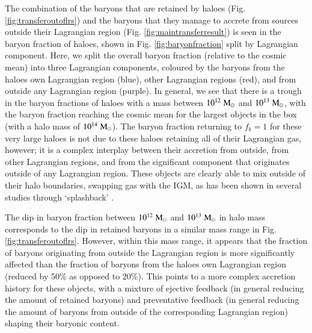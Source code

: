 \documentclass[fleqn,usenatbib]{mnras}
\newcommand{\msolar}{\;{\rm M}_{\odot}}
\begin{document}
The combination of the baryons that are retained by haloes (Fig.
\ref{fig:transferoutoflrs}) and the baryons that they manage to accrete from
sources outside their Lagrangian region (Fig. \ref{fig:maintransferresult})
is seen in the baryon fraction of haloes, shown in Fig.
\ref{fig:baryonfraction} split by Lagrangian component. Here, we split the
overall baryon fraction (relative to the cosmic mean) into three Lagrangian
components, coloured by the baryons from the haloes own Lagrangian region
(blue), other Lagrangian regions (red), and from outside any Lagrangian
region (purple). In general, we see that there is a trough in the baryon
fractions of haloes with a mass between $10^{12}\msolar{}$ and
$10^{13}\msolar{}$, with the baryon fraction reaching the cosmic mean for the
largest objects in the box (with a halo mass of $10^{14}\msolar{}$). The
baryon fraction returning to $f_b = 1$ for these very large haloes is not due
to these haloes retaining all of their Lagrangian gas, however; it is a
complex interplay between their accretion from outside, from other Lagrangian
regions, and from the significant component that originates outside of any
Lagrangian region. These objects are clearly able to mix outside of their
halo boundaries, swapping gas with the IGM, as has been shown in several
studies through `splashback' \citep{Mansfield2017, Diemer2017}.

The dip in baryon fraction between $10^{12}\msolar{}$ and $10^{13}\msolar{}$ in halo
mass corresponds to the dip in retained baryons in a similar mass range in
Fig. \ref{fig:transferoutoflrs}. However, within this mass range, it appears
that the fraction of baryons originating from outside the Lagrangian region is
more significantly affected than the fraction of baryons from the haloes own
Lagrangian region (reduced by 50\% as opposed to 20\%). This points
to a more complex accretion history for these objects, with a mixture of
ejective feedback (in general reducing the amount of retained baryons) and preventative
feedback (in general reducing the amount of baryons from outside of the
corresponding Lagrangian region) shaping their baryonic content.
\end{document}
